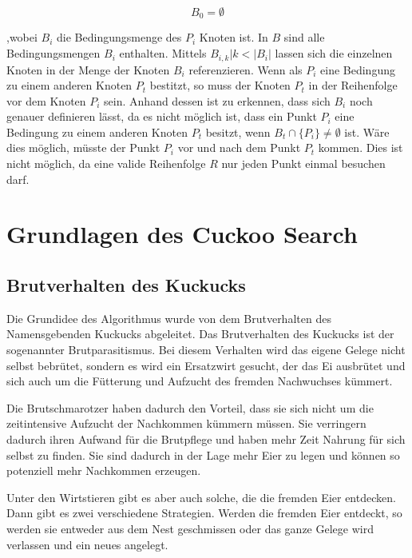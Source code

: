 \documentclass[conference]{IEEEtran}
\begin{document}
      \begin{equation}
          B_0 = \emptyset
      \end{equation}

      ,wobei $B_i$ die Bedingungsmenge des $P_i$ Knoten ist. In $B$ sind alle Bedingungsmengen 
      $B_i$ enthalten. 
      Mittels $B_{i,k} | k < |B_i|$ lassen sich die einzelnen Knoten in der Menge der Knoten $B_i$
      referenzieren. Wenn als $P_i$ eine Bedingung zu einem anderen Knoten $P_t$ bestitzt, 
      so muss der Knoten $P_t$ in der Reihenfolge vor dem Knoten $P_i$ sein. 
      Anhand dessen ist zu erkennen, dass sich $B_i$ noch genauer definieren lässt,
      da es nicht möglich ist, dass ein Punkt $P_i$ eine Bedingung zu einem anderen Knoten 
      $P_t$ besitzt, wenn $B_t \cap \{P_i\} \neq \emptyset$ ist. Wäre dies möglich, müsste der
      Punkt $P_i$ vor und nach dem Punkt $P_t$ kommen. Dies ist nicht möglich, da eine
      valide Reihenfolge $R$ nur jeden Punkt einmal besuchen darf.


  \section{Grundlagen des Cuckoo Search}
    \subsection{Brutverhalten des Kuckucks}
      Die Grundidee des Algorithmus wurde von dem Brutverhalten des Namensgebenden Kuckucks abgeleitet. 
      Das Brutverhalten des Kuckucks ist der sogenannter Brutparasitismus. Bei diesem Verhalten 
      wird das eigene Gelege nicht selbst bebrütet, sondern es wird ein Ersatzwirt gesucht, 
      der das Ei ausbrütet und sich auch um die Fütterung und Aufzucht des fremden Nachwuchses kümmert.

      Die Brutschmarotzer haben dadurch den Vorteil, dass sie sich nicht um die zeitintensive 
      Aufzucht der Nachkommen kümmern müssen. Sie verringern dadurch ihren Aufwand für die Brutpflege 
      und haben mehr Zeit Nahrung für sich selbst zu finden. Sie sind dadurch in der Lage mehr Eier zu legen 
      und können so potenziell mehr Nachkommen erzeugen. 

      Unter den Wirtstieren gibt es aber auch solche, die die fremden Eier entdecken. Dann gibt es zwei 
      verschiedene Strategien. Werden die fremden Eier entdeckt, so werden sie entweder aus dem Nest geschmissen 
      oder das ganze Gelege wird verlassen und ein neues angelegt. 
\end{document}
